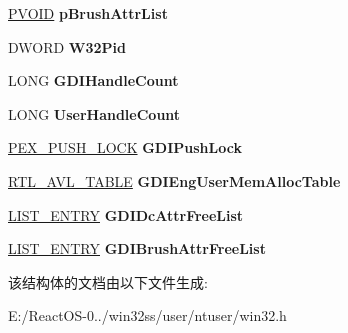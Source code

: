 \begin{DoxyCompactItemize}
\hyperlink{interfacevoid}{P\+V\+O\+ID} {\bfseries p\+Brush\+Attr\+List}
\item 
\mbox{\label{struct___w32_p_r_o_c_e_s_s_a4807ef3442c80577b018bfd8431d1fab}} 
D\+W\+O\+RD {\bfseries W32\+Pid}
\item 
\mbox{\label{struct___w32_p_r_o_c_e_s_s_a90ebbcde1f968fada8bd4fcf4c0ac6f6}} 
L\+O\+NG {\bfseries G\+D\+I\+Handle\+Count}
\item 
\mbox{\label{struct___w32_p_r_o_c_e_s_s_ab06e3247b21c89aedd53a4a7074c1859}} 
L\+O\+NG {\bfseries User\+Handle\+Count}
\item 
\mbox{\label{struct___w32_p_r_o_c_e_s_s_af5083ac28e24bdcadeb12c616a5e1ddf}} 
\hyperlink{struct___e_x___p_u_s_h___l_o_c_k}{P\+E\+X\+\_\+\+P\+U\+S\+H\+\_\+\+L\+O\+CK} {\bfseries G\+D\+I\+Push\+Lock}
\item 
\mbox{\label{struct___w32_p_r_o_c_e_s_s_ac297071a24889b81cbff24e0c60a3358}} 
\hyperlink{struct___r_t_l___a_v_l___t_a_b_l_e}{R\+T\+L\+\_\+\+A\+V\+L\+\_\+\+T\+A\+B\+LE} {\bfseries G\+D\+I\+Eng\+User\+Mem\+Alloc\+Table}
\item 
\mbox{\label{struct___w32_p_r_o_c_e_s_s_aad18c2f4f979971c2756bc7a26182cf7}} 
\hyperlink{struct___l_i_s_t___e_n_t_r_y}{L\+I\+S\+T\+\_\+\+E\+N\+T\+RY} {\bfseries G\+D\+I\+Dc\+Attr\+Free\+List}
\item 
\mbox{\label{struct___w32_p_r_o_c_e_s_s_ac331f084b05700c58343a1216ef04571}} 
\hyperlink{struct___l_i_s_t___e_n_t_r_y}{L\+I\+S\+T\+\_\+\+E\+N\+T\+RY} {\bfseries G\+D\+I\+Brush\+Attr\+Free\+List}
\end{DoxyCompactItemize}


该结构体的文档由以下文件生成\+:\begin{DoxyCompactItemize}
\item 
E\+:/\+React\+O\+S-\/0../win32ss/user/ntuser/win32.\+h\end{DoxyCompactItemize}
